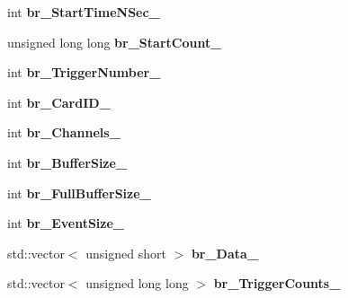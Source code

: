 \begin{DoxyCompactItemize}
\item 
\hypertarget{classannie_1_1RawReader_acefc82540c3fd5a95988dfbbf692115b}{
int {\bfseries br\_\-StartTimeNSec\_\-}}
\label{classannie_1_1RawReader_acefc82540c3fd5a95988dfbbf692115b}

\item 
\hypertarget{classannie_1_1RawReader_a3086ab236b86a0d8a49730d7819d28a1}{
unsigned long long {\bfseries br\_\-StartCount\_\-}}
\label{classannie_1_1RawReader_a3086ab236b86a0d8a49730d7819d28a1}

\item 
\hypertarget{classannie_1_1RawReader_ac64c20dac5983b21e223c531695d5261}{
int {\bfseries br\_\-TriggerNumber\_\-}}
\label{classannie_1_1RawReader_ac64c20dac5983b21e223c531695d5261}

\item 
\hypertarget{classannie_1_1RawReader_a712e7052ba063133d8a8ec305b971ddd}{
int {\bfseries br\_\-CardID\_\-}}
\label{classannie_1_1RawReader_a712e7052ba063133d8a8ec305b971ddd}

\item 
\hypertarget{classannie_1_1RawReader_a7aedb6d5ef04647ab4be754406de8d77}{
int {\bfseries br\_\-Channels\_\-}}
\label{classannie_1_1RawReader_a7aedb6d5ef04647ab4be754406de8d77}

\item 
\hypertarget{classannie_1_1RawReader_ab333ebd2c9c21fc9d745b77073280e2d}{
int {\bfseries br\_\-BufferSize\_\-}}
\label{classannie_1_1RawReader_ab333ebd2c9c21fc9d745b77073280e2d}

\item 
\hypertarget{classannie_1_1RawReader_afa644ab3780bc0b5a4ea82be84fe0718}{
int {\bfseries br\_\-FullBufferSize\_\-}}
\label{classannie_1_1RawReader_afa644ab3780bc0b5a4ea82be84fe0718}

\item 
\hypertarget{classannie_1_1RawReader_ac897918c63ff74d5b9562d33d9ed97e2}{
int {\bfseries br\_\-EventSize\_\-}}
\label{classannie_1_1RawReader_ac897918c63ff74d5b9562d33d9ed97e2}

\item 
\hypertarget{classannie_1_1RawReader_a6d0521fb16690c0db87d279f66cf5291}{
std::vector$<$ unsigned short $>$ {\bfseries br\_\-Data\_\-}}
\label{classannie_1_1RawReader_a6d0521fb16690c0db87d279f66cf5291}

\item 
\hypertarget{classannie_1_1RawReader_a92130fb80e359c5f21840cb29138f9af}{
std::vector$<$ unsigned long long $>$ {\bfseries br\_\-TriggerCounts\_\-}}
\label{classannie_1_1RawReader_a92130fb80e359c5f21840cb29138f9af}


\end{DoxyCompactItemize}
